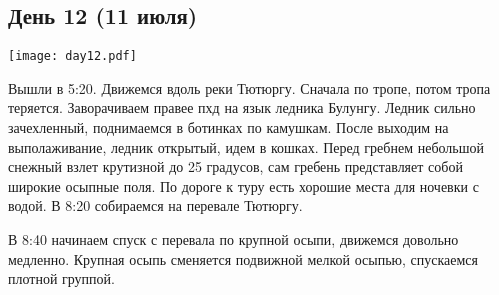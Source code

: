 \graphicspath{{Pictures/Chapter5/Day12}}


\subsection{День 12 (11 июля)}\label{subsec:Day12}
    \parbox[c]{\textwidth}{%
        \texttt{[image: day12.pdf]}\label{fig:Day12_map}%
    }
    \vspace{0.8cm}

Вышли в 5:20. Движемся вдоль реки Тютюргу. Сначала по тропе, потом тропа теряется. Заворачиваем правее пхд на язык ледника Булунгу. Ледник сильно зачехленный, поднимаемся в ботинках по камушкам. После выходим на выполаживание, ледник открытый, идем в кошках. Перед гребнем небольшой снежный взлет крутизной до 25 градусов, сам гребень представляет собой широкие осыпные поля. По дороге к туру есть хорошие места для ночевки с водой. В 8:20 собираемся на перевале Тютюргу.

В 8:40 начинаем спуск с перевала по крупной осыпи, движемся довольно медленно. Крупная осыпь сменяется подвижной мелкой осыпью, спускаемся плотной группой.

